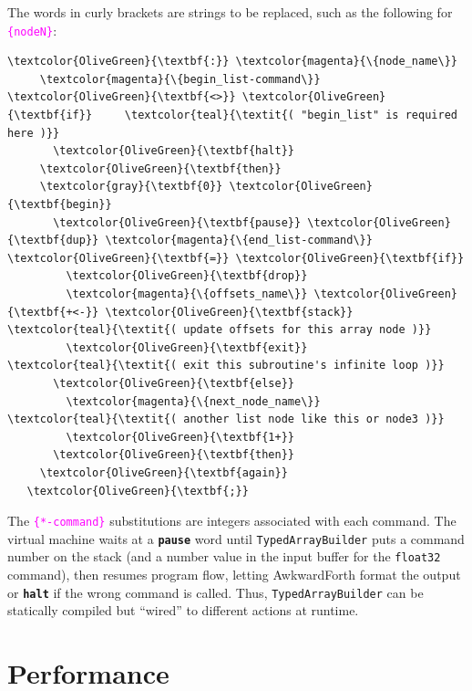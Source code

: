 \documentclass{webofc}
\begin{document}
\noindent The words in curly brackets are strings to be replaced, such as the following for \textcolor{magenta}{\tt \{nodeN\}}:

\small
\begin{Verbatim}[commandchars=\\\{\}]
   \textcolor{OliveGreen}{\textbf{:}} \textcolor{magenta}{\{node_name\}}
     \textcolor{magenta}{\{begin_list-command\}} \textcolor{OliveGreen}{\textbf{<>}} \textcolor{OliveGreen}{\textbf{if}}     \textcolor{teal}{\textit{( "begin_list" is required here )}}
       \textcolor{OliveGreen}{\textbf{halt}}
     \textcolor{OliveGreen}{\textbf{then}}
     \textcolor{gray}{\textbf{0}} \textcolor{OliveGreen}{\textbf{begin}}
       \textcolor{OliveGreen}{\textbf{pause}} \textcolor{OliveGreen}{\textbf{dup}} \textcolor{magenta}{\{end_list-command\}} \textcolor{OliveGreen}{\textbf{=}} \textcolor{OliveGreen}{\textbf{if}}
         \textcolor{OliveGreen}{\textbf{drop}}
         \textcolor{magenta}{\{offsets_name\}} \textcolor{OliveGreen}{\textbf{+<-}} \textcolor{OliveGreen}{\textbf{stack}}   \textcolor{teal}{\textit{( update offsets for this array node )}}
         \textcolor{OliveGreen}{\textbf{exit}}                       \textcolor{teal}{\textit{( exit this subroutine's infinite loop )}}
       \textcolor{OliveGreen}{\textbf{else}}
         \textcolor{magenta}{\{next_node_name\}}           \textcolor{teal}{\textit{( another list node like this or node3 )}}
         \textcolor{OliveGreen}{\textbf{1+}}
       \textcolor{OliveGreen}{\textbf{then}}
     \textcolor{OliveGreen}{\textbf{again}}
   \textcolor{OliveGreen}{\textbf{;}}
\end{Verbatim}
\normalsize

\noindent The \textcolor{magenta}{\tt \{*-command\}} substitutions are integers associated with each command. The virtual machine waits at a \textcolor{OliveGreen}{\tt\textbf{pause}} word until \texttt{TypedArrayBuilder} puts a command number on the stack (and a number value in the input buffer for the \texttt{float32} command), then resumes program flow, letting AwkwardForth format the output or \textcolor{OliveGreen}{\tt\textbf{halt}} if the wrong command is called. Thus, \texttt{TypedArrayBuilder} can be statically compiled but ``wired'' to different actions at runtime.

\section{Performance}
\label{sec:performance}
\end{document}
